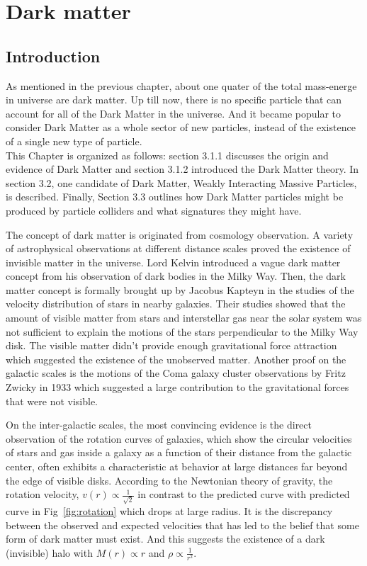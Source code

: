 \chapter{Dark matter}

\label{ch:dm}

\section{Introduction}
\par As mentioned in the previous chapter, about one quater of the total mass-energe in universe are dark matter.
Up till now, there is no specific particle that can account for all of the Dark Matter in the universe. And it became popular to consider Dark Matter as a whole sector of new particles, instead of the existence of a single new type of particle.\\
This Chapter is organized as follows: section 3.1.1 discusses the origin and evidence of Dark Matter and 
section 3.1.2 introduced the Dark Matter theory. In section 3.2, one candidate of Dark Matter, Weakly Interacting Massive Particles, is described. Finally, Section 3.3 outlines how Dark Matter particles might be produced by particle colliders and what signatures they might have.

\par The concept of dark matter is originated from cosmology observation. A variety of astrophysical observations at different distance scales proved the existence of invisible matter in the universe. Lord Kelvin introduced a vague dark matter concept from his observation of dark bodies in the Milky Way. Then, the dark matter concept is formally brought up by Jacobus Kapteyn in the studies of the velocity distribution of stars in nearby galaxies\cite{Kapteyn:1922zz}. Their studies showed that the amount of visible matter from stars and interstellar gas near the solar system was not sufficient to explain the motions of the stars perpendicular to the Milky Way disk. The visible matter didn't provide enough gravitational force attraction which suggested the existence of the unobserved matter. Another proof on the galactic scales is the motions of the Coma galaxy cluster observations by Fritz Zwicky in 1933\cite{Zwicky:1933gu} which suggested a large contribution to the gravitational forces that were not visible.

\par On the inter-galactic scales, the most convincing evidence is the direct observation of the rotation curves of galaxies, which show the circular velocities of stars and gas inside a galaxy as a function of their distance from the galactic center, often exhibits a characteristic at behavior at large distances far beyond the edge of visible disks. According to the Newtonian theory of gravity, the rotation velocity, $v(r) \propto \frac{1}{\sqrt{2}}$ in contrast to the predicted curve with predicted curve in Fig~\ref{fig:rotation} which drops at large radius. It is the discrepancy between the observed and expected velocities that has led to the belief that some form of dark matter must exist. And this suggests the existence of a dark (invisible) halo with $M(r) \propto r$ and $\rho \propto \frac{1}{r^2}$.

